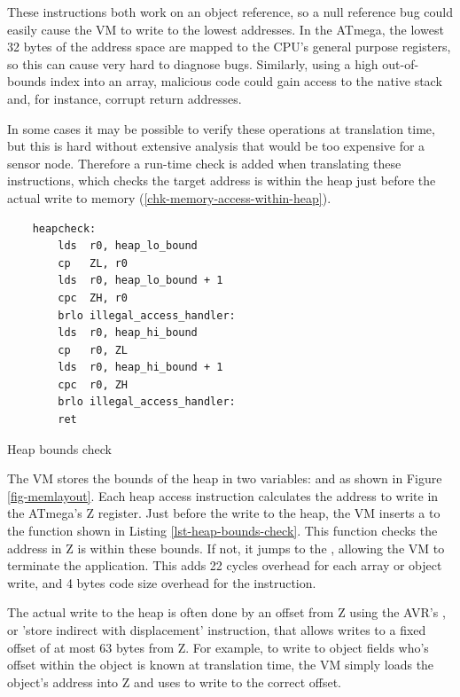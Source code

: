 These instructions both work on an object reference, so a null reference bug could easily cause the VM to write to the lowest addresses. In the ATmega, the lowest 32 bytes of the address space are mapped to the CPU's general purpose registers, so this can cause very hard to diagnose bugs. Similarly, using a high out-of-bounds index into an array, malicious code could gain access to the native stack and, for instance, corrupt return addresses.

In some cases it may be possible to verify these operations at translation time, but this is hard without extensive analysis that would be too expensive for a sensor node. Therefore a run-time check is added when translating these instructions, which checks the target address is within the heap just before the actual write to memory (\ref{chk-memory-access-within-heap}).

\begin{listing}
    \centering
    \begin{verbatim}
    heapcheck:
        lds  r0, heap_lo_bound
        cp   ZL, r0
        lds  r0, heap_lo_bound + 1
        cpc  ZH, r0
        brlo illegal_access_handler:
        lds  r0, heap_hi_bound
        cp   r0, ZL
        lds  r0, heap_hi_bound + 1
        cpc  r0, ZH
        brlo illegal_access_handler:
        ret
    \end{verbatim}
    \caption{Heap bounds check}
    \label{lst-heap-bounds-check}
\end{listing}

The VM stores the bounds of the heap in two variables:  and  as shown in Figure \ref{fig-memlayout}. Each heap access instruction calculates the address to write in the ATmega's Z register. Just before the write to the heap, the VM inserts a  to the  function shown in Listing \ref{lst-heap-bounds-check}. This function checks the address in Z is within these bounds. If not, it jumps to the , allowing the VM to terminate the application. This adds 22 cycles overhead for each array or object write, and 4 bytes code size overhead for the  instruction.

The actual write to the heap is often done by an offset from Z using the AVR's , or 'store indirect with displacement' instruction, that allows writes to a fixed offset of at most 63 bytes from Z. For example, to write to object fields who's offset within the object is known at translation time, the VM simply loads the object's address into Z and uses  to write to the correct offset.

